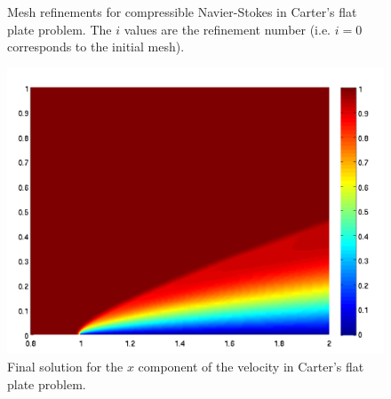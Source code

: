 \begin{figure}[h!]
{}
\caption{Mesh refinements for compressible Navier-Stokes in Carter's flat plate problem.  The $i$ values are the refinement number (i.e. $i=0$ corresponds to the initial mesh).}
\label{fig:JCmeshRefinements}
\end{figure}

\begin{figure}[h!]
\centering
\includegraphics[scale = 0.90]{figures/u1.pdf}
\caption{Final solution for the $x$ component of the velocity in Carter's flat plate problem.}
\label{fig:JCu1}
\end{figure}

